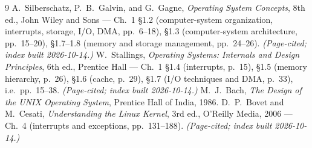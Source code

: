 \documentclass[11pt]{article}
\begin{document}
\begin{thebibliography}{9}
A.~Silberschatz, P.~B.~Galvin, and G.~Gagne, \emph{Operating System Concepts}, 8th ed., John Wiley and Sons --- Ch.~1 \S1.2 (computer-system organization, interrupts, storage, I/O, DMA, pp.~6--18), \S1.3 (computer-system architecture, pp.~15--20), \S1.7--1.8 (memory and storage management, pp.~24--26). \emph{(Page-cited; index built 2026-10-14.)}
W.~Stallings, \emph{Operating Systems: Internals and Design Principles}, 6th ed., Prentice Hall --- Ch.~1 \S1.4 (interrupts, p.~15), \S1.5 (memory hierarchy, p.~26), \S1.6 (cache, p.~29), \S1.7 (I/O techniques and DMA, p.~33), i.e.\ pp.~15--38. \emph{(Page-cited; index built 2026-10-14.)}
M.~J.~Bach, \emph{The Design of the UNIX Operating System}, Prentice Hall of India, 1986.
D.~P.~Bovet and M.~Cesati, \emph{Understanding the Linux Kernel}, 3rd ed., O'Reilly Media, 2006 --- Ch.~4 (interrupts and exceptions, pp.~131--188). \emph{(Page-cited; index built 2026-10-14.)}
\end{thebibliography}
\end{document}

